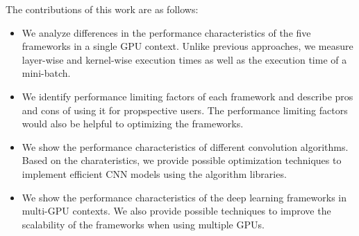 The contributions of this work are as follows:
\begin{itemize}
\item We analyze differences in the performance characteristics of the five frameworks in a single GPU context. Unlike previous approaches, we measure layer-wise and kernel-wise execution times as well as the execution time of a mini-batch. 

\item We identify performance limiting factors of each framework and describe pros and cons of using it for propspective users. The performance limiting factors would also be helpful to optimizing the frameworks.

\item We show the performance characteristics of different convolution algorithms. Based on the charateristics, we provide possible optimization techniques to implement efficient CNN models using the algorithm libraries.

\item We show the performance characteristics of the deep learning frameworks in multi-GPU contexts. We also provide possible techniques to improve the scalability of the frameworks when using multiple GPUs.
\end{itemize}




